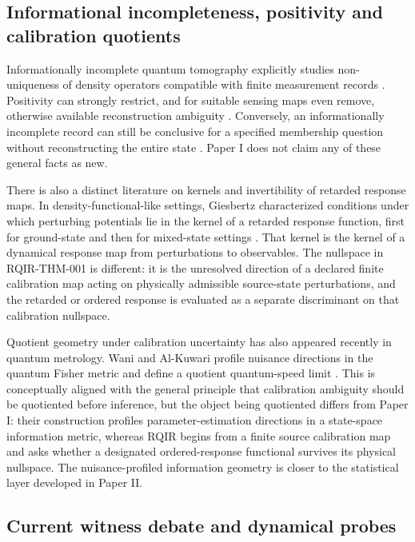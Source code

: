 \documentclass[11pt]{article}
\begin{document}
\subsection{Informational incompleteness, positivity and calibration quotients}

Informationally incomplete quantum tomography explicitly studies non-uniqueness of density operators compatible with finite measurement records \cite{DArianoParisSacchi2003,TeoRehacekHradil2013,GoncalvesEtAl2013}. Positivity can strongly restrict, and for suitable sensing maps even remove, otherwise available reconstruction ambiguity \cite{KalevKosutDeutsch2015}. Conversely, an informationally incomplete record can still be conclusive for a specified membership question without reconstructing the entire state \cite{LyyraKuuselaHeinosaari2019}. Paper I does not claim any of these general facts as new.

There is also a distinct literature on kernels and invertibility of retarded response maps. In density-functional-like settings, Giesbertz characterized conditions under which perturbing potentials lie in the kernel of a retarded response function, first for ground-state and then for mixed-state settings \cite{Giesbertz2015,Giesbertz2016}. That kernel is the kernel of a dynamical response map from perturbations to observables. The nullspace in RQIR-THM-001 is different: it is the unresolved direction of a declared finite calibration map acting on physically admissible source-state perturbations, and the retarded or ordered response is evaluated as a separate discriminant on that calibration nullspace.

Quotient geometry under calibration uncertainty has also appeared recently in quantum metrology. Wani and Al-Kuwari profile nuisance directions in the quantum Fisher metric and define a quotient quantum-speed limit \cite{WaniAlKuwari2026}. This is conceptually aligned with the general principle that calibration ambiguity should be quotiented before inference, but the object being quotiented differs from Paper I: their construction profiles parameter-estimation directions in a state-space information metric, whereas RQIR begins from a finite source calibration map and asks whether a designated ordered-response functional survives its physical nullspace. The nuisance-profiled information geometry is closer to the statistical layer developed in Paper II.

\subsection{Current witness debate and dynamical probes}
\end{document}
